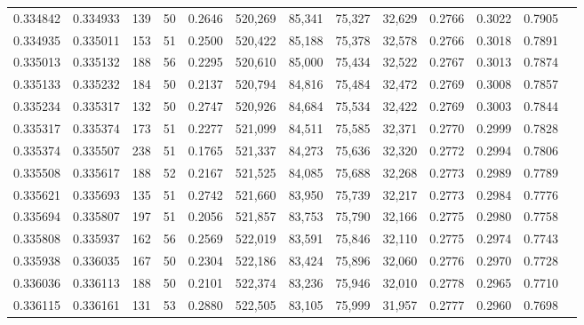 \begin{tabular}{rrrrrrrrrrrrr}
0.334842 & 0.334933 &   139 &  50 &                                     0.2646 & 520,269 &  85,341 &  75,327 &  32,629 & 0.2766 & 0.3022 & 0.7905 \\
0.334935 & 0.335011 &   153 &  51 &                                     0.2500 & 520,422 &  85,188 &  75,378 &  32,578 & 0.2766 & 0.3018 & 0.7891 \\
0.335013 & 0.335132 &   188 &  56 &                                     0.2295 & 520,610 &  85,000 &  75,434 &  32,522 & 0.2767 & 0.3013 & 0.7874 \\
0.335133 & 0.335232 &   184 &  50 &                                     0.2137 & 520,794 &  84,816 &  75,484 &  32,472 & 0.2769 & 0.3008 & 0.7857 \\
0.335234 & 0.335317 &   132 &  50 &                                     0.2747 & 520,926 &  84,684 &  75,534 &  32,422 & 0.2769 & 0.3003 & 0.7844 \\
0.335317 & 0.335374 &   173 &  51 &                                     0.2277 & 521,099 &  84,511 &  75,585 &  32,371 & 0.2770 & 0.2999 & 0.7828 \\
0.335374 & 0.335507 &   238 &  51 &                                     0.1765 & 521,337 &  84,273 &  75,636 &  32,320 & 0.2772 & 0.2994 & 0.7806 \\
0.335508 & 0.335617 &   188 &  52 &                                     0.2167 & 521,525 &  84,085 &  75,688 &  32,268 & 0.2773 & 0.2989 & 0.7789 \\
0.335621 & 0.335693 &   135 &  51 &                                     0.2742 & 521,660 &  83,950 &  75,739 &  32,217 & 0.2773 & 0.2984 & 0.7776 \\
0.335694 & 0.335807 &   197 &  51 &                                     0.2056 & 521,857 &  83,753 &  75,790 &  32,166 & 0.2775 & 0.2980 & 0.7758 \\
0.335808 & 0.335937 &   162 &  56 &                                     0.2569 & 522,019 &  83,591 &  75,846 &  32,110 & 0.2775 & 0.2974 & 0.7743 \\
0.335938 & 0.336035 &   167 &  50 &                                     0.2304 & 522,186 &  83,424 &  75,896 &  32,060 & 0.2776 & 0.2970 & 0.7728 \\
0.336036 & 0.336113 &   188 &  50 &                                     0.2101 & 522,374 &  83,236 &  75,946 &  32,010 & 0.2778 & 0.2965 & 0.7710 \\
0.336115 & 0.336161 &   131 &  53 &                                     0.2880 & 522,505 &  83,105 &  75,999 &  31,957 & 0.2777 & 0.2960 & 0.7698 \\

\end{tabular}
